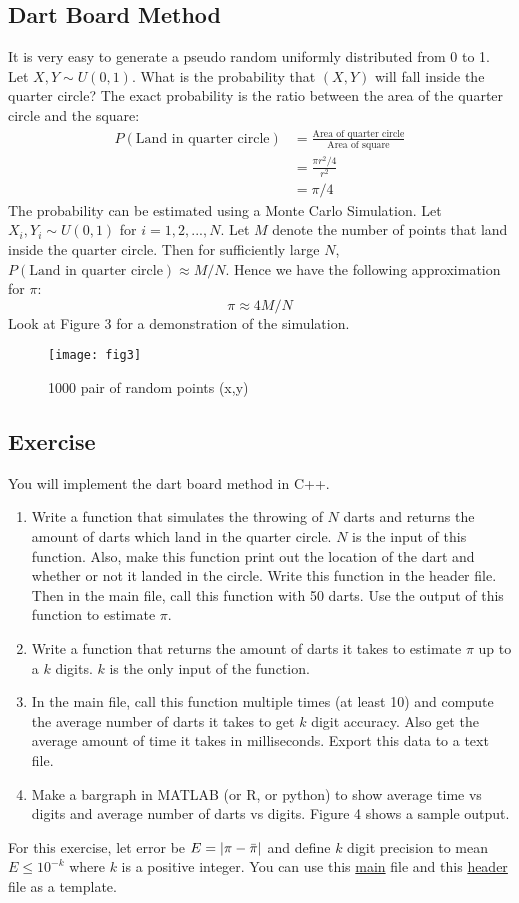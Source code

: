 \documentclass{article}
\begin{document}
\subsection{Dart Board Method}
It is very easy to generate a pseudo random uniformly distributed from 0 to 1. Let $X,Y\sim U(0,1)$. What is the probability that $(X,Y)$ will fall inside the quarter circle? The exact probability is the ratio between the area of the quarter circle and the square:
\begin{align*}
    P(\text{Land in quarter circle}) &= \frac{\text{Area of quarter circle}}{\text{Area of square}} \\
    &= \frac{\pi r^2/4}{r^2}  \\
    &= \pi /4
\end{align*}
The probability can be estimated using a Monte Carlo Simulation. Let $X_i,Y_i\sim U(0,1)$ for $i=1,2,...,N$. Let $M$ denote the number of points that land inside the quarter circle. Then for sufficiently large $N$, $P(\text{Land in quarter circle})\approx M/N$. Hence we have the following approximation for $\pi$:
$$\pi \approx 4M/N$$
Look at Figure 3 for a demonstration of the simulation.

\begin{figure}
\centering
\texttt{[image: fig3]}
\caption{1000 pair of random points (x,y)}
\end{figure}

\subsection{Exercise}
You will implement the dart board method in C++.
\begin{enumerate}
    \item Write a function that simulates the throwing of $N$ darts and returns the amount of darts which land in the quarter circle. $N$ is the input of this function. Also, make this function print out the location of the dart and whether or not it landed in the circle. Write this function in the header file. Then in the main file, call this function with 50 darts. Use the output of this function to estimate $\pi$.
    \item Write a function that returns the amount of darts it takes to estimate $\pi$ up to a $k$ digits. $k$ is the only input of the function.
    \item In the main file, call this function multiple times (at least 10) and compute the average number of darts it takes to get $k$ digit accuracy. Also get the average amount of time it takes in milliseconds. Export this data to a text file.
    \item Make a bargraph in MATLAB (or R, or python) to show average time vs digits and average number of darts vs digits. Figure 4 shows a sample output.
\end{enumerate}
For this exercise, let error be $E=|\pi - \Bar{\pi}|$ and define $k$ digit precision to mean $E\leq 10^{-k}$ where $k$ is a positive integer. You can use this \href{https://web.njit.edu/~tt73/Files/599/main.cpp}{main} file and this \href{https://web.njit.edu/~tt73/Files/599/header.h}{header} file as a template.
\end{document}
